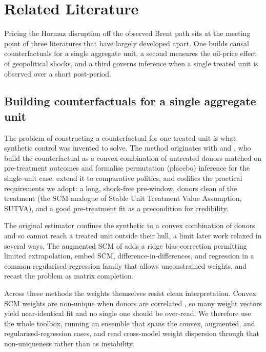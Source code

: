 \section{Related Literature}\label{sec:lit}
Pricing the Hormuz disruption off the observed Brent path sits at the meeting point of
three literatures that have largely developed apart. One builds causal counterfactuals for a
single aggregate unit, a second measures the oil-price effect of geopolitical shocks, and a
third governs inference when a single treated unit is observed over a short post-period.

\subsection{Building counterfactuals for a single aggregate unit}
The problem of constructing a counterfactual for one treated unit is what synthetic
control was invented to solve. The method originates with \citet{abadiegardeazabal2003}
and \citet{abadie2010}, who build the counterfactual as a convex combination of
untreated donors matched on pre-treatment outcomes and formalise permutation (placebo)
inference for the single-unit case. \citet{abadie2015} extend it to comparative
politics, and \citet{abadie2021} codifies the practical requirements we adopt: a long,
shock-free pre-window, donors clean of the treatment (the SCM analogue of Stable Unit Treatment Value Assumption, SUTVA), and a
good pre-treatment fit as a precondition for credibility. 

The original estimator confines the synthetic to a convex combination of donors and so
cannot reach a treated unit outside their hull, a limit later work relaxed in several ways.
The augmented SCM of \citet{benmichael2021} adds a ridge bias-correction permitting limited
extrapolation, \citet{doudchenko2016} embed SCM, difference-in-differences, and regression
in a common regularised-regression family that allows unconstrained weights, and
\citet{athey2021mc} recast the problem as matrix completion.

Across these methods the weights themselves resist clean interpretation. Convex SCM weights
are non-unique when donors are correlated \citep{abadielhour2021}, so many weight vectors
yield near-identical fit and no single one should be over-read. We therefore use the whole
toolbox, running an ensemble that spans the convex, augmented, and regularised-regression
cases, and read cross-model weight dispersion through that non-uniqueness rather than as
instability.

